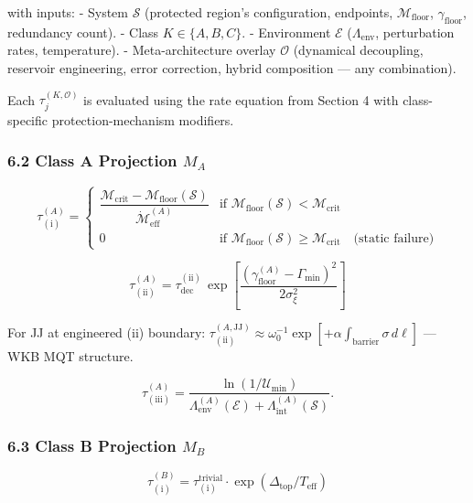 \documentclass[
  11pt,
  a4paper,
]{article}
\begin{document}
with inputs: - System \(\mathcal{S}\) (protected region's configuration,
endpoints, \(\mathcal{M}_{\mathrm{floor}}\),
\(\gamma_{\mathrm{floor}}\), redundancy count). - Class
\(K \in \{A, B, C\}\). - Environment \(\mathcal{E}\)
(\(\Lambda_{\mathrm{env}}\), perturbation rates, temperature). -
Meta-architecture overlay \(\mathcal{O}\) (dynamical decoupling,
reservoir engineering, error correction, hybrid composition --- any
combination).

Each \(\tau_j^{(K,\mathcal{O})}\) is evaluated using the rate equation
from Section 4 with class-specific protection-mechanism modifiers.

\subsubsection{\texorpdfstring{6.2 Class A Projection
\(M_A\)}{6.2 Class A Projection M\_A}}\label{class-a-projection-m_a}

\[
\tau_{(\mathrm{i})}^{(A)} = \begin{cases}
\dfrac{\mathcal{M}_{\mathrm{crit}} - \mathcal{M}_{\mathrm{floor}}(\mathcal{S})}{\dot{\mathcal{M}}_{\mathrm{eff}}^{(A)}} & \text{if } \mathcal{M}_{\mathrm{floor}}(\mathcal{S}) < \mathcal{M}_{\mathrm{crit}} \\[4pt]
0 & \text{if } \mathcal{M}_{\mathrm{floor}}(\mathcal{S}) \geq \mathcal{M}_{\mathrm{crit}} \quad\text{(static failure)}
\end{cases}
\]

\[
\tau_{(\mathrm{ii})}^{(A)} = \tau_{\mathrm{dec}}^{(\mathrm{ii})}\,\exp\!\left[\frac{(\gamma_{\mathrm{floor}}^{(A)} - \Gamma_{\mathrm{min}})^2}{2\sigma_\xi^2}\right]
\]

For JJ at engineered (ii) boundary:
\(\tau_{(\mathrm{ii})}^{(A,\mathrm{JJ})} \approx \omega_0^{-1}\exp[+\alpha\int_{\mathrm{barrier}}\sigma\,d\ell]\)
--- WKB MQT structure.

\[
\tau_{(\mathrm{iii})}^{(A)} = \frac{\ln(1/\mathcal{U}_{\mathrm{min}})}{\Lambda_{\mathrm{env}}^{(A)}(\mathcal{E}) + \Lambda_{\mathrm{int}}^{(A)}(\mathcal{S})}.
\]

\subsubsection{\texorpdfstring{6.3 Class B Projection
\(M_B\)}{6.3 Class B Projection M\_B}}\label{class-b-projection-m_b}

\[
\tau_{(\mathrm{i})}^{(B)} = \tau_{(\mathrm{i})}^{\mathrm{trivial}}\cdot\exp(\Delta_{\mathrm{top}}/T_{\mathrm{eff}})
\]
\end{document}

